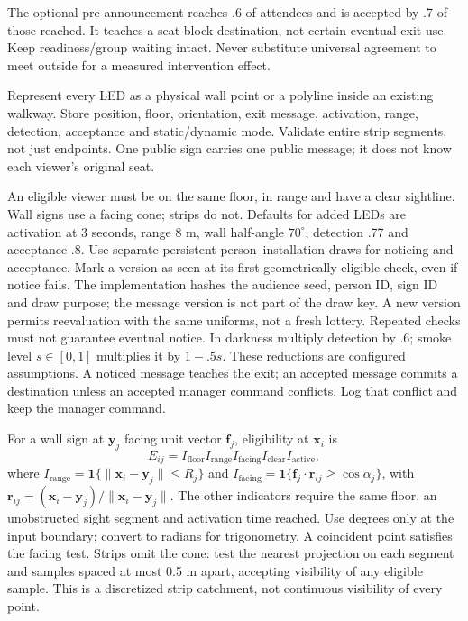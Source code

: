 \documentclass[11pt,a4paper]{article}
\newcommand{\ind}{\mathbf{1}}
\begin{document}
The optional pre-announcement reaches .6 of attendees and is accepted by .7 of those reached. It teaches a seat-block destination, not certain eventual exit use. Keep readiness/group waiting intact. Never substitute universal agreement to meet outside for a measured intervention effect.

Represent every LED as a physical wall point or a polyline inside an existing walkway. Store position, floor, orientation, exit message, activation, range, detection, acceptance and static/dynamic mode. Validate entire strip segments, not just endpoints. One public sign carries one public message; it does not know each viewer's original seat.

An eligible viewer must be on the same floor, in range and have a clear sightline. Wall signs use a facing cone; strips do not. Defaults for added LEDs are activation at 3 seconds, range 8 m, wall half-angle $70^\circ$, detection .77 and acceptance .8. Use separate persistent person--installation draws for noticing and acceptance. Mark a version as seen at its first geometrically eligible check, even if notice fails. The implementation hashes the audience seed, person ID, sign ID and draw purpose; the message version is not part of the draw key. A new version permits reevaluation with the same uniforms, not a fresh lottery. Repeated checks must not guarantee eventual notice. In darkness multiply detection by .6; smoke level $s\in[0,1]$ multiplies it by $1-.5s$. These reductions are configured assumptions. A noticed message teaches the exit; an accepted message commits a destination unless an accepted manager command conflicts. Log that conflict and keep the manager command.

For a wall sign at $\mathbf y_j$ facing unit vector $\mathbf f_j$, eligibility at $\mathbf x_i$ is
\begin{equation}
 E_{ij}=I_{\mathrm{floor}}I_{\mathrm{range}}I_{\mathrm{facing}}I_{\mathrm{clear}}I_{\mathrm{active}},
\label{impl:visibility}
\end{equation}
where $I_{\mathrm{range}}=\ind\{\|\mathbf x_i-\mathbf y_j\|\le R_j\}$ and
$I_{\mathrm{facing}}=\ind\{\mathbf f_j\cdot\mathbf r_{ij}\ge\cos\alpha_j\}$, with
$\mathbf r_{ij}=(\mathbf x_i-\mathbf y_j)/\|\mathbf x_i-\mathbf y_j\|$.
The other indicators require the same floor, an unobstructed sight segment and activation time reached. Use degrees only at the input boundary; convert to radians for trigonometry. A coincident point satisfies the facing test. Strips omit the cone: test the nearest projection on each segment and samples spaced at most 0.5 m apart, accepting visibility of any eligible sample. This is a discretized strip catchment, not continuous visibility of every point.
\end{document}
